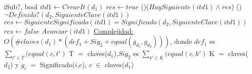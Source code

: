 \begin{Algoritmos}
\begin{algoritmo}{iSub?}{, }{bool}
    $itd1 \gets CrearIt(d_1) $ 
    $res \gets true $ 
    \While(){($HaySiguiente(itd1) \land res$)}{
    	\eIf(){$\lnot Definido?(d_2,SiguienteClave(itd1))$}{
			$res \gets SiguienteSignificado(itd1) = Significado(d_2,SiguienteClave(itd1))$ 
		}{
        	$res \gets false $ 
        }
		$Avanzar(itd1)$ 
	}
    \medskip
	\underline{Complejidad:} $O(\#claves(d_1)*(def_1 + Sig_2 + equal(g_{d_1},g_{d_2})))$, donde $def_1$ es $\sum_{t' \in T}(equal(c,t')$ T $=$ claves($d_1$),$Sig_2$ es $\sum_{k' \in K}(equal(c,k')$ K $=$ claves($d_2$) y $g_i$ $=$ Significado($i$,$c$), $c$ $\in$ claves($d_1$)
\end{algoritmo}

\end{Algoritmos}

